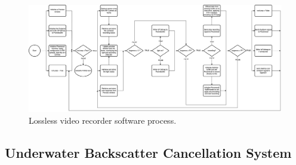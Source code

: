 \pagebreak
\begin{landscape}
    \begin{figure}
        \centering
        \includegraphics[width=1\linewidth]{assets/impl_rec-flow.png}
        \caption{Lossless video recorder software process.}
        \label{fig:recflow}
    \end{figure}
\end{landscape}
\pagebreak

\subsection{Underwater Backscatter Cancellation System}
\label{system_impl}

